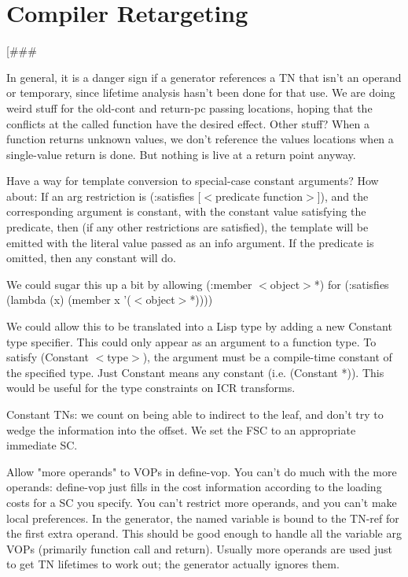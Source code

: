\part{Compiler Retargeting}

[\#\#\#

In general, it is a danger sign if a generator references a TN that isn't an
operand or temporary, since lifetime analysis hasn't been done for that use.
We are doing weird stuff for the old-cont and return-pc passing locations,
hoping that the conflicts at the called function have the desired effect.
Other stuff?  When a function returns unknown values, we don't reference the
values locations when a single-value return is done.  But nothing is live at a
return point anyway.



Have a way for template conversion to special-case constant arguments?  
How about:
    If an arg restriction is (:satisfies [$<$predicate function$>$]), and the
    corresponding argument is constant, with the constant value satisfying the
    predicate, then (if any other restrictions are satisfied), the template
    will be emitted with the literal value passed as an info argument.  If the
    predicate is omitted, then any constant will do.

    We could sugar this up a bit by allowing (:member $<$object$>$*) for
    (:satisfies (lambda (x) (member x '($<$object$>$*))))

We could allow this to be translated into a Lisp type by adding a new Constant
type specifier.  This could only appear as an argument to a function type.
To satisfy (Constant $<$type$>$), the argument must be a compile-time constant of
the specified type.  Just Constant means any constant (i.e. (Constant *)).
This would be useful for the type constraints on ICR transforms.


Constant TNs: we count on being able to indirect to the leaf, and don't try to
wedge the information into the offset.  We set the FSC to an appropriate
immediate SC.

    Allow "more operands" to VOPs in define-vop.  You can't do much with the
    more operands: define-vop just fills in the cost information according to
    the loading costs for a SC you specify.  You can't restrict more operands,
    and you can't make local preferences.  In the generator, the named variable
    is bound to the TN-ref for the first extra operand.  This should be good
    enough to handle all the variable arg VOPs (primarily function call and
    return).  Usually more operands are used just to get TN lifetimes to work
    out; the generator actually ignores them.

